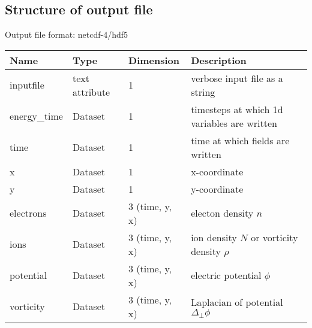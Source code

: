 \subsection{Structure of output file}
Output file format: netcdf-4/hdf5
%
\begin{longtable}{lll>{\RaggedRight}p{7cm}}
\toprule
\rowcolor{gray!50}\textbf{Name} &  \textbf{Type} & \textbf{Dimension} & \textbf{Description}  \\ \midrule
inputfile  &             text attribute & 1 & verbose input file as a string \\
energy\_time             & Dataset & 1 & timesteps at which 1d variables are written \\
time                     & Dataset & 1 & time at which fields are written \\
x                        & Dataset & 1 & x-coordinate  \\
y                        & Dataset & 1 & y-coordinate \\
electrons                & Dataset & 3 (time, y, x) & electon density $n$ \\
ions                     & Dataset & 3 (time, y, x) & ion density $N$ or vorticity density $\rho$  \\
potential                & Dataset & 3 (time, y, x) & electric potential $\phi$  \\
vorticity                & Dataset & 3 (time, y, x) & Laplacian of potential $\Delta_{\perp}\phi$  \\
\bottomrule
\end{longtable}




